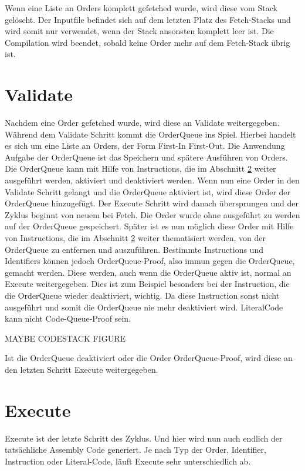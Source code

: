 Wenn eine Liste an Orders komplett gefetched wurde, wird diese vom Stack gelöscht. Der Inputfile befindet sich auf dem letzten Platz des Fetch-Stacks und wird somit nur verwendet, wenn der Stack ansonsten komplett leer ist.
Die Compilation wird beendet, sobald keine Order mehr auf dem Fetch-Stack übrig ist.

\section{Validate} \label{sec:qhs-Validate}
Nachdem eine Order gefetched wurde, wird diese an Validate weitergegeben. Während dem Validate Schritt kommt die OrderQueue ins Spiel. Hierbei handelt es sich um eine Liste an Orders, der Form First-In First-Out.
Die Anwendung Aufgabe der OrderQueue ist das Speichern und spätere Ausführen von Orders. Die OrderQueue kann mit Hilfe von Instructions, die im Abschnitt \ref{sec:qhs-execute} weiter ausgeführt werden, aktiviert und deaktiviert werden.
Wenn nun eine Order in den Validate Schritt gelangt und die OrderQueue aktiviert ist, wird diese Order der OrderQueue hinzugefügt. Der Execute Schritt wird danach übersprungen und der Zyklus beginnt von neuem bei Fetch.
Die Order wurde ohne ausgeführt zu werden auf der OrderQueue gespeichert. Später ist es nun möglich diese Order mit Hilfe von Instructions, die im Abschnitt \ref{sec:qhs-execute} weiter thematisiert werden, 
von der OrderQueue zu entfernen und auszuführen. Bestimmte Instructions und Identifiers können jedoch OrderQueue-Proof, also immun gegen die OrderQueue, gemacht werden. Diese werden, auch wenn die OrderQueue aktiv ist, 
normal an Execute weitergegeben. Dies ist zum Beispiel besonders bei der Instruction, die die OrderQueue wieder deaktiviert, wichtig. Da diese Instruction sonst nicht ausgeführt und somit die OrderQueue nie mehr deaktiviert wird.
LiteralCode kann nicht Code-Queue-Proof sein.

MAYBE CODESTACK FIGURE

Ist die OrderQueue deaktiviert oder die Order OrderQueue-Proof, wird diese an den letzten Schritt Execute weitergegeben.

\section{Execute} \label{sec:qhs-execute}
Execute ist der letzte Schritt des Zyklus. Und hier wird nun auch endlich der tatsächliche Assembly Code generiert. Je nach Typ der Order, Identifier, Instruction oder Literal-Code, läuft Execute sehr unterschiedlich ab.

